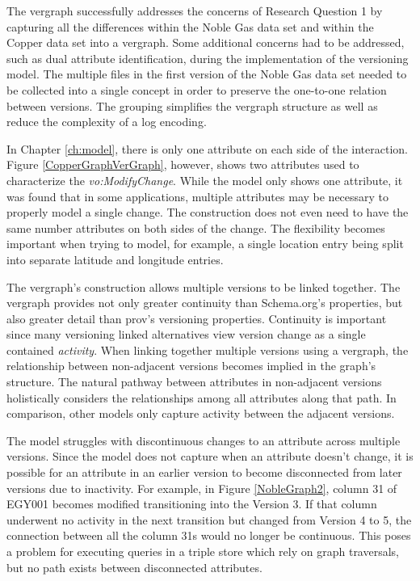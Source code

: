 The \gls{vergraph} successfully addresses the concerns of Research Question 1 by capturing all the differences within the Noble Gas data set and within the Copper data set into a \gls{vergraph}.
Some additional concerns had to be addressed, such as dual \gls{attribute} identification, during the implementation of the versioning model.
The multiple files in the first version of the Noble Gas data set needed to be collected into a single concept in order to preserve the one-to-one relation between \glspl{version}.
The grouping simplifies the \gls{vergraph} structure as well as reduce the complexity of a \gls{log} encoding.

In Chapter \ref{ch:model}, there is only one \gls{attribute} on each side of the interaction.
Figure \ref{CopperGraphVerGraph}, however, shows two \glspl{attribute} used to characterize the \textit{vo:ModifyChange}.
While the model only shows one \gls{attribute}, it was found that in some applications, multiple \glspl{attribute} may be necessary to properly model a single \gls{change}.
The construction does not even need to have the same number \glspl{attribute} on both sides of the \gls{change}.
The flexibility becomes important when trying to model, for example, a single location entry being split into separate latitude and longitude entries.

The \gls{vergraph}'s construction allows multiple \glspl{version} to be linked together.
The \gls{vergraph} provides not only greater continuity than Schema.org's properties, but also greater detail than \gls{prov}'s versioning properties.
Continuity is important since many versioning \gls{linked} alternatives view version change as a single contained \textit{activity}.
When linking together multiple \glspl{version} using a \gls{vergraph}, the relationship between non-adjacent \glspl{version} becomes implied in the graph's structure.
The natural pathway between \glspl{attribute} in non-adjacent \glspl{version} holistically considers the relationships among all \glspl{attribute} along that path.
In comparison, other models only capture activity between the adjacent \glspl{version}.

The model struggles with discontinuous changes to an \gls{attribute} across multiple \glspl{version}.
Since the model does not capture when an \gls{attribute} doesn't change, it is possible for an \gls{attribute} in an earlier \gls{version} to become disconnected from later \glspl{version} due to inactivity.
For example, in Figure \ref{NobleGraph2}, column 31 of EGY001 becomes modified transitioning into the Version 3.
If that column underwent no activity in the next transition but changed from Version 4 to 5, the connection between all the column 31s would no longer be continuous.
This poses a problem for executing queries in a triple store which rely on graph traversals, but no path exists between disconnected \glspl{attribute}.

